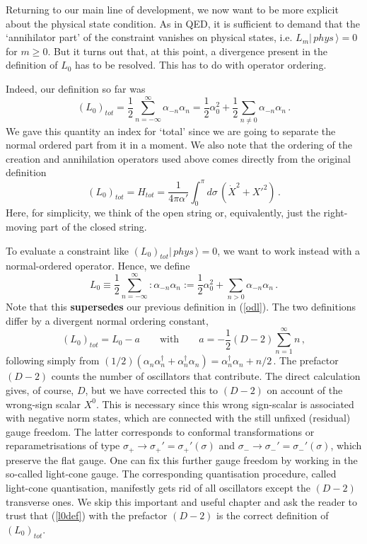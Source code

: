 \documentclass[12pt]{article}
\newcommand{\be}{\begin{equation}}
\newcommand{\ee}{\end{equation}}
\numberwithin{equation}{section}
\begin{document}
Returning to our main line of development, we now want to be more explicit about the physical state condition. As in QED, it is sufficient to demand that the `annihilator part' of the constraint vanishes on physical states, i.e. $L_m|\,phys\,\rangle=0$ for $m\ge 0$. But it turns out that, at this point, a divergence present in the definition of $L_0$ has to be resolved. This has to do with operator ordering.

Indeed, our definition so far was 
\be
(L_0)_{tot} = \frac{1}{2}\sum_{n=-\infty}^\infty \alpha_{-n}\alpha_n=
\frac{1}{2}\alpha_0^2+\frac{1}{2}\sum_{n \neq 0} \alpha_{-n}\alpha_n\,.
\ee
We gave this quantity an index for `total' since we are going to separate the normal ordered part from it in a moment. We also note that the ordering of the creation and annihilation operators used above comes directly from the original definition 
\be
(L_0)_{tot}=H_{tot}=\frac{1}{4\pi\alpha'}\int_0^\pi d\sigma\,(\dot{X}^2+X'^2)\,.
\ee
Here, for simplicity, we think of the open string or, equivalently, just the right-moving part of the closed string.

To evaluate a constraint like $(L_0)_{tot}|\,phys\,\rangle=0$, we want to work instead with a normal-ordered operator. Hence, we define
\be
L_0\equiv \frac{1}{2}\sum_{n=-\infty}^\infty:\alpha_{-n}\alpha_n:=\frac{1}{2}\alpha_0^2 +\sum_{n>0}\alpha_{-n}\alpha_n\,.
\ee
Note that this {\bf supersedes} our previous definition in (\ref{odl}). The two definitions differ by a divergent normal ordering constant,
\be
(L_{0})_{tot}=L_0-a\qquad \mbox{with} \qquad a=-\frac{1}{2}(D-2) \sum_{n=1}^\infty n\,,\label{l0def}
\ee
following simply from $(1/2)(\alpha_n\alpha_n^\dagger+\alpha_n^\dagger \alpha_n)=\alpha_n^\dagger \alpha_n+n/2$\,. The prefactor $(D-2)$ counts the number of oscillators that contribute. The direct calculation gives, of course, $D$, but we have corrected this to $(D-2)$ on account of the wrong-sign scalar $X^0$. This is necessary since this wrong sign-scalar is associated with negative norm states, which are connected with the still unfixed (residual) gauge freedom. The latter corresponds to conformal transformations or reparametrisations of type $\sigma_+\to \sigma_+'=\sigma_+'(\sigma)$ and $\sigma_-\to \sigma_-'=\sigma_-'(\sigma)$, which preserve the flat gauge. One can fix this further gauge freedom by working in the so-called light-cone gauge. The corresponding quantisation procedure, called light-cone quantisation, manifestly gets rid of all oscillators except the $(D-2)$ transverse ones. We skip this important and useful chapter and ask the reader to trust that (\ref{l0def}) with the prefactor $(D-2)$ is the correct definition of $(L_0)_{tot}$.
\end{document}
